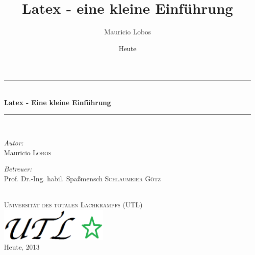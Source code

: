 \documentclass[a4paper]{book}
\author{Mauricio Lobos}
\title{Latex - eine kleine Einführung}
\date{Heute}
\begin{document}

\begin{titlepage}
\begin{center}

\rule{\linewidth}{0.5mm} \\[0.5cm]
{\LARGE \bf Latex - Eine kleine Einführung} \\[0.3mm] 
\rule{\linewidth}{0.5mm} \\[2cm]

\begin{minipage}{0.4\textwidth}
	\begin{flushleft}
	\large \emph{Autor:} \\
	Mauricio \textsc{Lobos}
	\end{flushleft}
\end{minipage}
\begin{minipage}{0.4\textwidth}
	\begin{flushright}
	\large \emph{Betreuer:} \\
	Prof. Dr.-Ing. habil. Spaßmensch \textsc{Schlaumeier Götz}
	\end{flushright}
\end{minipage} \\[4cm]

\textsc{Universität des totalen Lachkrampfs (UTL)} \\
\includegraphics[width=0.4\textwidth]{pics/utl_logo.eps} \\[2cm]

Heute, 2013

\end{center}
\end{titlepage}


\tableofcontents







\end{document}

